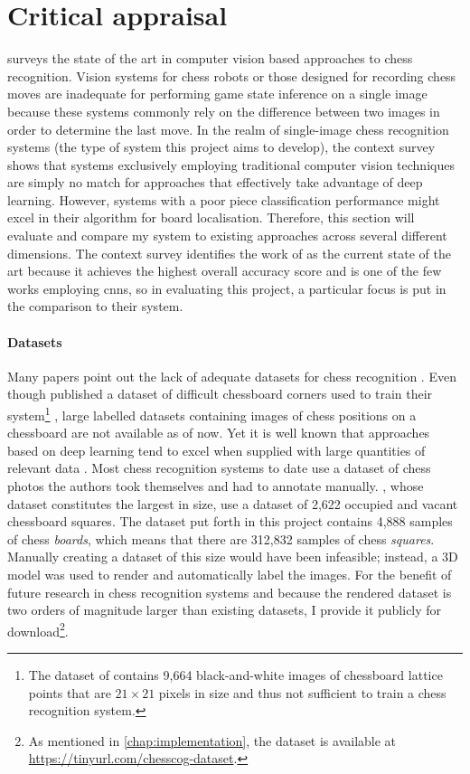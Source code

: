 \documentclass[../report.tex]{subfiles}
\begin{document}
\section{Critical appraisal}
 surveys the state of the art in computer vision based approaches to chess recognition. 
Vision systems for chess robots or those designed for recording chess moves are inadequate for performing game state inference on a single image because these systems commonly rely on the difference between two images in order to determine the last move.
In the realm of single-image chess recognition systems (the type of system this project aims to develop), the context survey shows that systems exclusively employing traditional computer vision techniques are simply no match for approaches that effectively take advantage of deep learning.
However, systems with a poor piece classification performance might excel in their algorithm for board localisation.
Therefore, this section will evaluate and compare my system to existing approaches across several different dimensions.
The context survey identifies the work of \textcite{mehta2020} as the current state of the art because it achieves the highest overall accuracy score and is one of the few works employing \glspl{cnn}, so in evaluating this project, a particular focus is put in the comparison to their system.

\paragraph{Datasets}
Many papers point out the lack of adequate datasets for chess recognition \cite{czyzewski2020,ding2016,mehta2020}.
Even though \citeauthor{czyzewski2018} published a dataset \cite{czyzewski2018} of difficult chessboard corners used to train their system\footnote{The dataset of \citeauthor{czyzewski2018} contains 9,664 black-and-white images of chessboard lattice points that are $21\times 21$ pixels in size and thus not sufficient to train a chess recognition system.} \cite{czyzewski2020}, large labelled datasets containing images of chess positions on a chessboard are not available as of now.
Yet it is well known that approaches based on deep learning tend to excel when supplied with large quantities of relevant data \cite{halevy2009}.
Most chess recognition systems to date use a dataset of chess photos the authors took themselves and had to annotate manually.
\Textcite{mehta2020}, whose dataset constitutes the largest in size, use a dataset of 2,622 occupied and vacant chessboard squares.
The dataset put forth in this project contains 4,888 samples of chess \emph{boards}, which means that there are 312,832 samples of chess \emph{squares}.
Manually creating a dataset of this size would have been infeasible; instead, a 3D model was used to render and automatically label the images.
For the benefit of future research in chess recognition systems and because the rendered dataset is two orders of magnitude larger than existing datasets, I provide it publicly for download\footnote{As mentioned in \cref{chap:implementation}, the dataset is available at \url{https://tinyurl.com/chesscog-dataset}.}.
\end{document}
